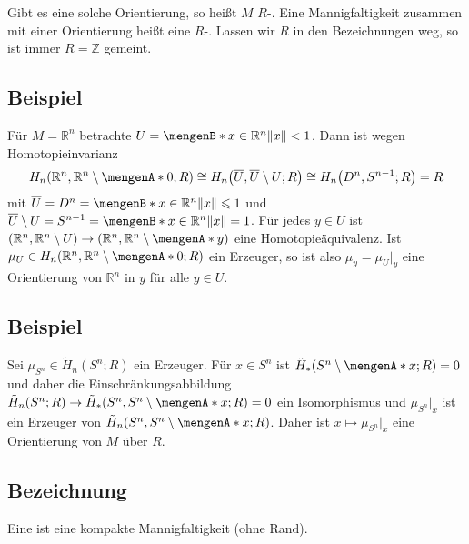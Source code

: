 Gibt es eine solche Orientierung, so heißt $M$ $R$-. Eine Mannigfaltigkeit zusammen mit einer Orientierung heißt eine 
$R$-. Lassen wir $R$ in den Bezeichnungen weg, so ist immer $R=\mathds{Z}$ gemeint.

\subsection[Beispiel: Orientierung von $\mathds{R}^n$]{Beispiel} %
\label{sub:166}
Für $M=\mathds{R}^n$ betrachte $U= \set[x \in \mathds{R}^n]{\norm{x}<1}$. Dann ist wegen Homotopieinvarianz
\[
	H_n \enbrace*{\mathds{R}^n,\mathds{R}^n \setminus \set{0};R} \cong H_n \enbrace*{\overline{U},\overline{U} \setminus U;R} \cong H_n \enbrace*{D^n,S^{n-1};R}=R 
\]
mit $\overline{U} = D^n  = \set[x \in \mathds{R}^n]{\norm{x}\le 1}$ und $\overline{U}\setminus U = S^{n-1} =\set[x \in \mathds{R}^n]{\norm{x}=1} $. Für jedes $y \in U$
ist $\enbrace*{\mathds{R}^n,\mathds{R}^n \setminus U} \to \enbrace*{\mathds{R}^n, \mathds{R}^n\setminus \set{y}}$ eine Homotopieäquivalenz. Ist 
$\mu_U \in H_n(\mathds{R}^n,\mathds{R}^n \setminus \set{0};R)$ ein Erzeuger, so ist also $\mu_y = \mu_U|_y$ eine Orientierung von $\mathds{R}^n$ in $y$ für alle $y \in U$.

\subsection[Beispiel: Orientierung von $S^n$]{Beispiel} %
\label{sub:167}
Sei $\mu_{S^n} \in \tilde{H}_n(S^n;R)$ ein Erzeuger. Für $x \in S^n$ ist $\tilde{H}_*(S^n \setminus \set{x};R)= 0$ und daher die Einschränkungsabbildung 
$\tilde{H}_n(S^n;R) \to \tilde{H}_*(S^n,S^n \setminus \set{x};R)= 0$ ein Isomorphismus und $\mu_{S^n}|_x$ ist ein Erzeuger von $\tilde{H}_n(S^n, S^n\setminus \set{x};R)$. Daher 
ist $x \mapsto \mu_{S^n}|_x$ eine Orientierung von $M$ über $R$.

\subsection[Bezeichnung: Geschlossene Mannigfaltigkeit]{Bezeichnung} %
\label{sub:168}
Eine  ist eine kompakte Mannigfaltigkeit (ohne Rand).

